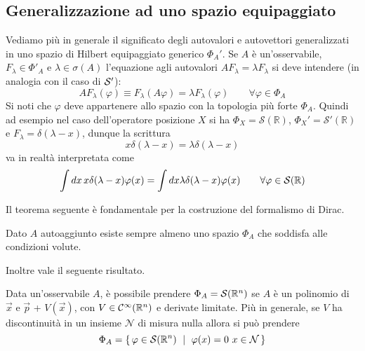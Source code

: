 \documentclass[../../FisicaTeorica.tex]{subfiles}
\begin{document}
\subsection{Generalizzazione ad uno spazio equipaggiato}
Vediamo più in generale il significato degli autovalori e autovettori generalizzati in uno spazio di Hilbert equipaggiato generico $\Phi_A'$. Se $A$ è un'osservabile, $F_\lambda \in \Phi'_A$ e $\lambda \in \sigma(A)$ l'equazione agli autovalori $A F_\lambda = \lambda F_\lambda$ si deve intendere (in analogia con il caso di $\mathcal S'$):
\[
A F_\lambda (\varphi) \equiv F_\lambda (A \varphi) = \lambda F_\lambda(\varphi) \qquad \forall \varphi \in \Phi_A
\]
Si noti che $\varphi$ deve appartenere allo spazio con la topologia più forte $\Phi_A$. Quindi ad esempio nel caso dell'operatore posizione $X$ si ha $\Phi_X = \mathcal S(\mathbb R)$, $\Phi_X' = \mathcal S'(\mathbb R)$ e $F_\lambda = \delta(\lambda - x)$, dunque la scrittura
\[
x \delta(\lambda - x) = \lambda \delta(\lambda - x)
\]
va in realtà interpretata come
\[
\int d x \, x \delta(\lambda - x) \varphi(x) = \int d x \lambda \delta(\lambda - x) \varphi(x) \qquad \forall \varphi \in \mathcal S(\mathbb R)
\]

Il teorema seguente è fondamentale per la costruzione del formalismo di Dirac.
\begin{thm}
Dato $A$ autoaggiunto esiste sempre almeno uno spazio $\Phi_A$ che soddisfa alle condizioni volute.
\end{thm}
Inoltre vale il seguente risultato.
\begin{thm}
Data un'osservabile $A$, è possibile prendere $\Phi_A = \mathcal S(\mathbb R^n)$ se $A$ è un polinomio di $\vec x$ e $\vec p$ + $V(\vec x)$, con $V \in {\mathcal C}^\infty(\mathbb R^n)$ e derivate limitate. Più in generale, se $V$ ha discontinuità in un insieme $\mathcal N$ di misura nulla allora si può prendere
\[
\Phi_A = \set{\varphi \in \mathcal S(\mathbb R^n) \,\, | \,\, \varphi(x) = 0 \,\, x \in \mathcal N}
\]
\end{thm}
\end{document}
